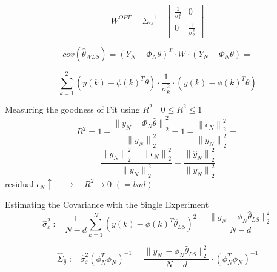 \begin{equation*}
W^{ OPT } = \Sigma _{ ^{ \varepsilon_{ N } } }^{ -1 }\quad \begin{bmatrix} \frac { 1 }{ \sigma _{ 1 }^{ 2 } }  & 0 \\ 0 & \frac { 1 }{ \sigma _{ 2 }^{ 2 } }  \end{bmatrix}
\end{equation*}

\begin{equation*}
cov({ \hat { \theta  } _{ WLS } }){ =({ Y }_{ N }-{ \Phi  }_{ N }\theta ) }^{ T }\cdot W\cdot ({ Y }_{ N }-{ \Phi  }_{ N }\theta )=
\end{equation*}

\begin{equation*}
\sum _{ k=1 }^{ 2 }{ (y(k)-{ \phi (k) }^{ T }\theta )\cdot \frac { 1 }{ { \sigma  }_{ k }^{ 2 } } \cdot (y(k)-{ \phi (k) }^{ T }\theta ) } 
\end{equation*}


Measuring the goodness of Fit using \({R}^{2} \quad 0\le {R}^{2} \le1\) 
\begin{equation*}
{ R }^{ 2 }=1-\frac { { \parallel { y }_{ N }-{ \Phi  }_{ N }\hat { \theta  } \parallel  }_{ 2 }^{ 2 } }{ { \parallel { y }_{ N }\parallel  }_{ 2 }^{ 2 } } =1-\frac { { \parallel { \epsilon  }_{ N }\parallel  }_{ 2 }^{ 2 } }{ { \parallel { y }_{ N }\parallel  }_{ 2 }^{ 2 } } =
\end{equation*}
\begin{equation*}
\frac { { \parallel { y }_{ N }\parallel  }_{ 2 }^{ 2 }-{ \parallel { \epsilon  }_{ N }\parallel  }_{ 2 }^{ 2 } }{ { \parallel { y }_{ N }\parallel  }_{ 2 }^{ 2 } } =\frac { { \parallel { \hat { y  }  }_{ N }\parallel  }_{ 2 }^{ 2 } }{ { \parallel { y }_{ N }\parallel  }_{ 2 }^{ 2 } } 
\end{equation*}
residual $ \epsilon_{N} \uparrow \quad \rightarrow \quad R^{2} \rightarrow 0 \,\,(= bad)$





Estimating the Covariance with the Single Experiment
\begin{equation*}
\hat { \sigma  } _{ \varepsilon  }^{ 2 } := \frac { 1 }{ N-d } \sum _{ k=1 }^{ N }{ (y(k)-\phi (k)^{ T }\hat { \theta  } _{ LS })^{ 2 } }  = \frac { \parallel y_{ N }-\phi _{ N }\hat { \theta  } _{ LS }{ \parallel  }_{ 2 }^{ 2 } }{ N-d } 
\end{equation*}

\begin{equation*}
\hat { \Sigma  } _{ \hat { \theta  }  } := \hat { \sigma  } ^{ 2 }_{ \varepsilon  } (\phi ^{ T }_{ N } \phi _{ N })^{ -1 } = \frac { \parallel y_{ N }\, -\phi _{ N }\hat { \theta  } _{ LS }{ \parallel  }_{ 2 }^{ 2 } }{ N-d } \cdot (\phi ^{ T }_{ N } \phi _{ N })^{ -1 }
\end{equation*}



